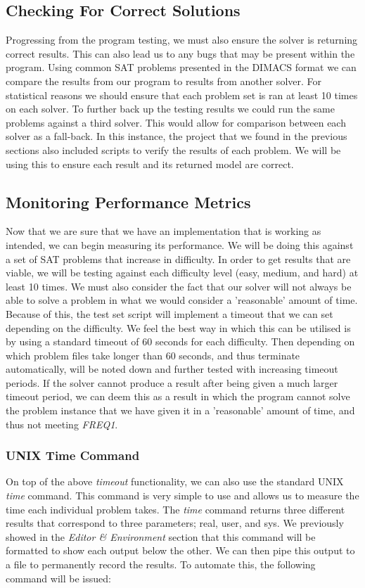 \documentclass{article}
\begin{document}
\subsection{Checking For Correct Solutions}
Progressing from the program testing, we must also ensure the solver is returning correct results.
This can also lead us to any bugs that may be present within the program. Using common SAT problems
presented in the DIMACS format we can compare the results from our program to results from another
solver. For statistical reasons we should ensure that each problem set is ran at least 10 times on
each solver. To further back up the testing results we could run the same problems against a third
solver. This would allow for comparison between each solver as a fall-back. In this instance, the project that we found in the
previous sections also included scripts to verify the results of each problem. We will be using this to ensure each result and its
returned model are correct.

\subsection{Monitoring Performance Metrics}
Now that we are sure that we have an implementation that is working as intended, we can begin measuring its performance. We will 
be doing this against a set of SAT problems that increase in difficulty. In order to get results that are viable, we will be 
testing against each difficulty level (easy, medium, and hard) at least 10 times. We must also consider the fact that our solver 
will not always be able to solve a problem in what we would consider a 'reasonable' amount of time. Because of this, the test set 
script will implement a timeout that we can set depending on the difficulty. We feel the best way in which this can be utilised 
is by using a standard timeout of 60 seconds for each difficulty. Then depending on which problem files take longer than 60 
seconds, and thus terminate automatically, will be noted down and further tested with increasing timeout periods. If the solver 
cannot produce a result after being given a much larger timeout period, we can deem this as a result in which the program cannot 
solve the problem instance that we have given it in a 'reasonable' amount of time, and thus not meeting \textit{FREQ1}.

\subsubsection{UNIX Time Command}
On top of the above \textit{timeout} functionality, we can also use the standard UNIX \textit{time} command. This command is very 
simple to use and allows us to measure the time each individual problem takes. The \textit{time} command returns three different 
results that correspond to three parameters; real, user, and sys. We previously showed in the \textit{Editor \& Environment} 
section that this command will be formatted to show each output below the other. We can then pipe this output to a file to 
permanently record the results. To automate this, the following command will be issued:
\end{document}
